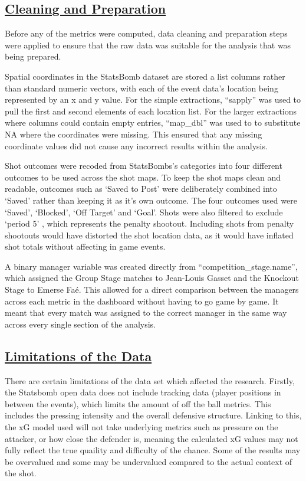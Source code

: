\documentclass[
  11pt,
  letterpaper,
  DIV=11,
  numbers=noendperiod]{scrartcl}
\begin{document}
\subsection{\texorpdfstring{\ul{Cleaning and
Preparation}}{Cleaning and Preparation}}\label{cleaning-and-preparation}

Before any of the metrics were computed, data cleaning and preparation
steps were applied to ensure that the raw data was suitable for the
analysis that was being prepared.

Spatial coordinates in the StatsBomb dataset are stored a list columns
rather than standard numeric vectors, with each of the event data's
location being represented by an x and y value. For the simple
extractions, ``sapply'' was used to pull the first and second elements
of each location list. For the larger extractions where columns could
contain empty entries, ``map\_dbl'' was used to to substitute NA where
the coordinates were missing. This ensured that any missing coordinate
values did not cause any incorrect results within the analysis.

Shot outcomes were recoded from StatsBombs's categories into four
different outcomes to be used across the shot maps. To keep the shot
maps clean and readable, outcomes such as `Saved to Post' were
deliberately combined into `Saved' rather than keeping it as it's own
outcome. The four outcomes used were `Saved', `Blocked', `Off Target'
and `Goal'. Shots were also filtered to exclude `period 5' , which
represents the penalty shootout. Including shots from penalty shootouts
would have distorted the shot location data, as it would have inflated
shot totals without affecting in game events.

A binary manager variable was created directly from
``competition\_stage.name'', which assigned the Group Stage matches to
Jean-Louis Gasset and the Knockout Stage to Emerse Faé. This allowed for
a direct comparison between the managers across each metric in the
dashboard without having to go game by game. It meant that every match
was assigned to the correct manager in the same way across every single
section of the analysis.

\subsection{\texorpdfstring{\ul{Limitations of the
Data}}{Limitations of the Data}}\label{limitations-of-the-data}

There are certain limitations of the data set which affected the
research. Firstly, the Statsbomb open data does not include tracking
data (player positions in between the events), which limits the amount
of off the ball metrics. This includes the pressing intensity and the
overall defensive structure. Linking to this, the xG model used will not
take underlying metrics such as pressure on the attacker, or how close
the defender is, meaning the calculated xG values may not fully reflect
the true quaility and difficulty of the chance. Some of the results may
be overvalued and some may be undervalued compared to the actual context
of the shot.
\end{document}
